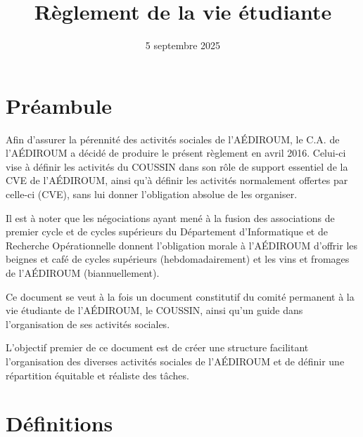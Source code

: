 \documentclass{aediroum}
\title{Règlement de la vie étudiante}
\date{5 septembre 2025}
\begin{document}
\maketitle

\section{Préambule}\label{sec:preambule}

Afin d'assurer la pérennité des activités sociales de l'AÉDIROUM, le C.A. de l'AÉDIROUM a décidé de produire le présent règlement en avril 2016. Celui-ci vise à définir les activités du COUSSIN dans son rôle de support essentiel de la CVE de l'AÉDIROUM, ainsi qu'à définir les activités normalement offertes par celle-ci (CVE), sans lui donner l'obligation absolue de les organiser.

Il est à noter que les négociations ayant mené à la fusion des associations de premier cycle et de cycles supérieurs du Département d'Informatique et de Recherche Opérationnelle donnent l'obligation morale à l'AÉDIROUM d'offrir les beignes et café de cycles supérieurs (hebdomadairement) et les vins et fromages de l'AÉDIROUM (biannuellement).

Ce document se veut à la fois un document constitutif du comité permanent à la vie étudiante de l'AÉDIROUM, le COUSSIN, ainsi qu'un guide dans l'organisation de ses activités sociales.

L'objectif premier de ce document est de créer une structure facilitant l'organisation des diverses activités sociales de l'AÉDIROUM et de définir une répartition équitable et réaliste des tâches.

\section{Définitions}\label{sec:definitions}
\end{document}
